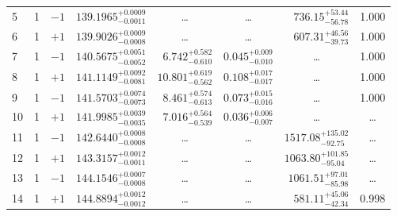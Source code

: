 \begin{table*}[!]
\begin{tabular}{llcrrlrc}
5 & 1 & $-1$ & $    139.1965_{-      0.0011}^{+      0.0009}$ & \multicolumn{1}{c}{\dots} & \multicolumn{1}{c}{\dots} & $      736.15_{-       56.78}^{+       53.44}$ & 1.000\\[1pt]
6 & 1 & $+1$ & $    139.9026_{-      0.0008}^{+      0.0009}$ & \multicolumn{1}{c}{\dots} & \multicolumn{1}{c}{\dots} & $      607.31_{-       39.73}^{+       46.56}$ & 1.000\\[1pt]
7 & 1 & $-1$ & $    140.5675_{-      0.0052}^{+      0.0051}$ & $       6.742_{-       0.610}^{+       0.582}$ & $       0.045_{-       0.010}^{+       0.009}$ & \multicolumn{1}{c}{\dots} & 1.000\\[1pt]
8 & 1 & $+1$ & $    141.1149_{-      0.0081}^{+      0.0092}$ & $      10.801_{-       0.562}^{+       0.619}$ & $       0.108_{-       0.017}^{+       0.017}$ & \multicolumn{1}{c}{\dots} & 1.000\\[1pt]
9 & 1 & $-1$ & $    141.5703_{-      0.0073}^{+      0.0074}$ & $       8.461_{-       0.613}^{+       0.574}$ & $       0.073_{-       0.016}^{+       0.015}$ & \multicolumn{1}{c}{\dots} & 1.000\\[1pt]
10 & 1 & $+1$ & $    141.9985_{-      0.0035}^{+      0.0039}$ & $       7.016_{-       0.539}^{+       0.564}$ & $       0.036_{-       0.007}^{+       0.006}$ & \multicolumn{1}{c}{\dots} & \dots\\[1pt] 
11 & 1 & $-1$ & $    142.6440_{-      0.0008}^{+      0.0008}$ & \multicolumn{1}{c}{\dots} & \multicolumn{1}{c}{\dots} & $     1517.08_{-       92.75}^{+      135.02}$ & \dots\\[1pt]
12 & 1 & $+1$ & $    143.3157_{-      0.0011}^{+      0.0012}$ & \multicolumn{1}{c}{\dots} & \multicolumn{1}{c}{\dots} & $     1063.80_{-       95.04}^{+      101.85}$ & \dots\\[1pt]
13 & 1 & $-1$ & $    144.1546_{-      0.0008}^{+      0.0007}$ & \multicolumn{1}{c}{\dots} & \multicolumn{1}{c}{\dots} & $     1061.51_{-       85.98}^{+       97.01}$ & \dots\\[1pt]
14 & 1 & $+1$ & $    144.8894_{-      0.0012}^{+      0.0012}$ & \multicolumn{1}{c}{\dots} & \multicolumn{1}{c}{\dots} & $      581.11_{-       42.34}^{+       45.06}$ & 0.998\\[1pt]


\end{tabular}
\end{table*}

